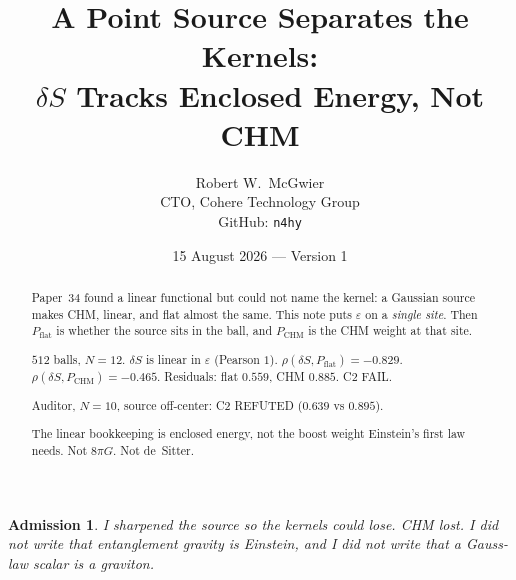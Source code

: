 \documentclass[11pt]{article}
\title{\textbf{A Point Source Separates the Kernels:\\
$\delta S$ Tracks Enclosed Energy, Not CHM}}
\author{Robert W.\ McGwier\\
\small CTO, Cohere Technology Group\\
\small GitHub: \texttt{n4hy}}
\date{15 August 2026 --- Version 1}
\newtheorem*{admission}{Admission}
\begin{document}
\maketitle

\begin{abstract}
\noindent
Paper~34 found a linear functional but could not name the
kernel: a Gaussian source makes CHM, linear, and flat almost
the same. This note puts $\varepsilon$ on a \emph{single site}.
Then $P_{\mathrm{flat}}$ is whether the source sits in the
ball, and $P_{\mathrm{CHM}}$ is the CHM weight at that site.

$512$ balls, $N=12$. $\delta S$ is linear in $\varepsilon$
(Pearson $1$). $\rho(\delta S,P_{\mathrm{flat}})=-0.829$.
$\rho(\delta S,P_{\mathrm{CHM}})=-0.465$. Residuals:
flat $0.559$, CHM $0.885$. C2 FAIL.

Auditor, $N=10$, source off-center: C2 REFUTED
($0.639$ vs $0.895$).

The linear bookkeeping is enclosed energy, not the boost
weight Einstein's first law needs. Not $8\pi G$. Not de~Sitter.
\end{abstract}

\begin{admission}
I sharpened the source so the kernels could lose. CHM lost.
I did not write that entanglement gravity is Einstein, and I
did not write that a Gauss-law scalar is a graviton.
\end{admission}
\end{document}

